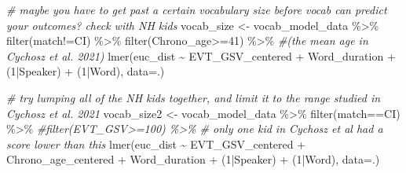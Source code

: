 \documentclass[
]{article}
\newenvironment{Shaded}{\begin{snugshade}}{\end{snugshade}}
\newcommand{\AttributeTok}[1]{\textcolor[rgb]{0.77,0.63,0.00}{#1}}
\newcommand{\CommentTok}[1]{\textcolor[rgb]{0.56,0.35,0.01}{\textit{#1}}}
\newcommand{\DecValTok}[1]{\textcolor[rgb]{0.00,0.00,0.81}{#1}}
\newcommand{\FunctionTok}[1]{\textcolor[rgb]{0.00,0.00,0.00}{#1}}
\newcommand{\NormalTok}[1]{#1}
\newcommand{\OtherTok}[1]{\textcolor[rgb]{0.56,0.35,0.01}{#1}}
\newcommand{\SpecialCharTok}[1]{\textcolor[rgb]{0.00,0.00,0.00}{#1}}
\newcommand{\StringTok}[1]{\textcolor[rgb]{0.31,0.60,0.02}{#1}}
\begin{document}
\begin{Shaded}
\begin{Highlighting}[]
\CommentTok{\# maybe you have to get past a certain vocabulary size before vocab can predict your outcomes? check with NH kids}
\NormalTok{vocab\_size }\OtherTok{\textless{}{-}}\NormalTok{ vocab\_model\_data }\SpecialCharTok{\%\textgreater{}\%}
  \FunctionTok{filter}\NormalTok{(match}\SpecialCharTok{!=}\StringTok{\textquotesingle{}CI\textquotesingle{}}\NormalTok{) }\SpecialCharTok{\%\textgreater{}\%}
  \FunctionTok{filter}\NormalTok{(Chrono\_age}\SpecialCharTok{\textgreater{}=}\DecValTok{41}\NormalTok{) }\SpecialCharTok{\%\textgreater{}\%} \CommentTok{\#(the mean age in Cychosz et al. 2021)}
  \FunctionTok{lmer}\NormalTok{(euc\_dist }\SpecialCharTok{\textasciitilde{}}\NormalTok{ EVT\_GSV\_centered }\SpecialCharTok{+} 
\NormalTok{         Word\_duration }\SpecialCharTok{+} 
\NormalTok{         (}\DecValTok{1}\SpecialCharTok{|}\NormalTok{Speaker) }\SpecialCharTok{+} 
\NormalTok{         (}\DecValTok{1}\SpecialCharTok{|}\NormalTok{Word), }
       \AttributeTok{data=}\NormalTok{.) }
  
\CommentTok{\# try lumping all of the NH kids together, and limit it to the range studied in Cychosz et al. 2021}
\NormalTok{vocab\_size2 }\OtherTok{\textless{}{-}}\NormalTok{ vocab\_model\_data }\SpecialCharTok{\%\textgreater{}\%}
  \FunctionTok{filter}\NormalTok{(match}\SpecialCharTok{==}\StringTok{\textquotesingle{}CI\textquotesingle{}}\NormalTok{) }\SpecialCharTok{\%\textgreater{}\%}
  \CommentTok{\#filter(EVT\_GSV\textgreater{}=100) \%\textgreater{}\% \# only one kid in Cychosz et al had a score lower than this}
  \FunctionTok{lmer}\NormalTok{(euc\_dist }\SpecialCharTok{\textasciitilde{}}\NormalTok{ EVT\_GSV\_centered }\SpecialCharTok{+} 
\NormalTok{         Chrono\_age\_centered }\SpecialCharTok{+} 
\NormalTok{         Word\_duration }\SpecialCharTok{+} 
\NormalTok{         (}\DecValTok{1}\SpecialCharTok{|}\NormalTok{Speaker) }\SpecialCharTok{+} 
\NormalTok{         (}\DecValTok{1}\SpecialCharTok{|}\NormalTok{Word), }
       \AttributeTok{data=}\NormalTok{.) }
\end{Highlighting}
\end{Shaded}
\end{document}
